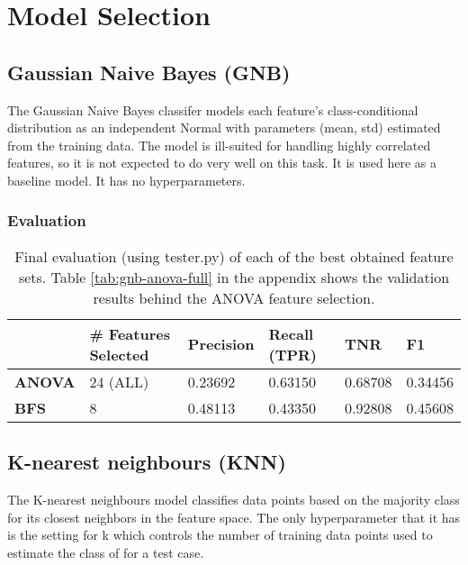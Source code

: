 \documentclass{article}
\begin{document}
\section{Model Selection}


\subsection{Gaussian Naive Bayes (GNB)}

The Gaussian Naive Bayes classifer models each feature's class-conditional distribution as an independent Normal with parameters (mean, std) estimated from the training data. The model is ill-suited for handling highly correlated features, so it is not expected to do very well on this task. It is used here as a baseline model. It has no hyperparameters.

\subsubsection{Evaluation}

\begin{table}[H]
\centering
\caption{Final evaluation (using tester.py) of each of the best obtained feature sets. Table \ref{tab:gnb-anova-full} in the appendix shows the validation results behind the ANOVA feature selection.}
\label{my-label}
\begin{tabular}{|l|l|l|l|l|l|}
\hline
               & \textbf{\# Features Selected} & \textbf{Precision} & \textbf{Recall (TPR)} & \textbf{TNR} & \textbf{F1} \\ \hline
\textbf{ANOVA} & 24 (ALL)                      & 0.23692            & 0.63150               & 0.68708      & 0.34456     \\ \hline
\textbf{BFS}   & 8                             & 0.48113            & 0.43350               & 0.92808      & 0.45608     \\ \hline
\end{tabular}
\end{table}
\subsection{K-nearest neighbours (KNN)}

The K-nearest neighbours model classifies data points based on the majority class for its closest neighbors in the feature space. The only hyperparameter that it has is the setting for k which controls the number of training data points used to estimate the class of for a test case. 
\end{document}
